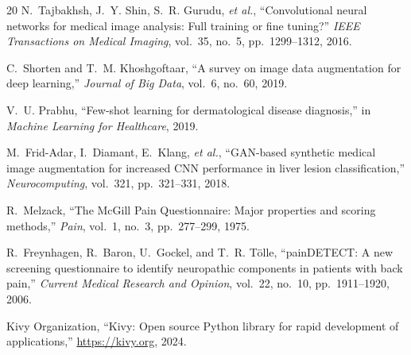 \documentclass[conference]{IEEEtran}
\begin{document}
\begin{thebibliography}{20}
N.~Tajbakhsh, J.~Y. Shin, S.~R. Gurudu, \emph{et al.}, ``Convolutional neural networks for medical image analysis: Full training or fine tuning?'' \emph{IEEE Transactions on Medical Imaging}, vol.~35, no.~5, pp.~1299--1312, 2016.

C.~Shorten and T.~M. Khoshgoftaar, ``A survey on image data augmentation for deep learning,'' \emph{Journal of Big Data}, vol.~6, no.~60, 2019.

V.~U. Prabhu, ``Few-shot learning for dermatological disease diagnosis,'' in \emph{Machine Learning for Healthcare}, 2019.

M.~Frid-Adar, I.~Diamant, E.~Klang, \emph{et al.}, ``GAN-based synthetic medical image augmentation for increased CNN performance in liver lesion classification,'' \emph{Neurocomputing}, vol.~321, pp.~321--331, 2018.

R.~Melzack, ``The McGill Pain Questionnaire: Major properties and scoring methods,'' \emph{Pain}, vol.~1, no.~3, pp.~277--299, 1975.

R.~Freynhagen, R.~Baron, U.~Gockel, and T.~R. T{\"o}lle, ``painDETECT: A new screening questionnaire to identify neuropathic components in patients with back pain,'' \emph{Current Medical Research and Opinion}, vol.~22, no.~10, pp.~1911--1920, 2006.

Kivy Organization, ``Kivy: Open source Python library for rapid development of applications,'' \url{https://kivy.org}, 2024.

\end{thebibliography}
\end{document}
